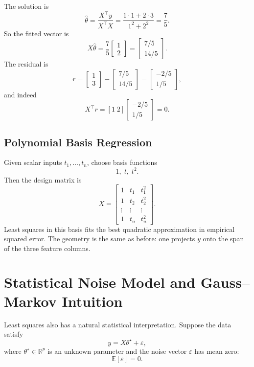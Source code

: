 The solution is
\[
\hat\theta = \frac{X^\top y}{X^\top X}
= \frac{1\cdot 1 + 2\cdot 3}{1^2+2^2}
= \frac{7}{5}.
\]
So the fitted vector is
\[
X\hat\theta=
\frac75
\begin{bmatrix}
1\\2
\end{bmatrix}
=
\begin{bmatrix}
7/5\\14/5
\end{bmatrix}.
\]
The residual is
\[
r=
\begin{bmatrix}
1\\3
\end{bmatrix}
-
\begin{bmatrix}
7/5\\14/5
\end{bmatrix}
=
\begin{bmatrix}
-2/5\\1/5
\end{bmatrix},
\]
and indeed
\[
X^\top r = [1\;2]
\begin{bmatrix}
-2/5\\1/5
\end{bmatrix}
=0.
\]

\subsection{Polynomial Basis Regression}

Given scalar inputs $t_1,\dots,t_n$, choose basis functions
\[
1,\; t,\; t^2.
\]
Then the design matrix is
\[
X=
\begin{bmatrix}
1&t_1&t_1^2\\
1&t_2&t_2^2\\
\vdots&\vdots&\vdots\\
1&t_n&t_n^2
\end{bmatrix}.
\]
Least squares in this basis fits the best quadratic approximation in empirical squared error. The geometry is the same as before: one projects $y$ onto the span of the three feature columns.

\section{Statistical Noise Model and Gauss--Markov Intuition}

Least squares also has a natural statistical interpretation. Suppose the data satisfy
\[
y = X\theta^\star + \varepsilon,
\]
where $\theta^\star\in\mathbb R^p$ is an unknown parameter and the noise vector $\varepsilon$ has mean zero:
\[
\mathbb E[\varepsilon]=0.
\]

